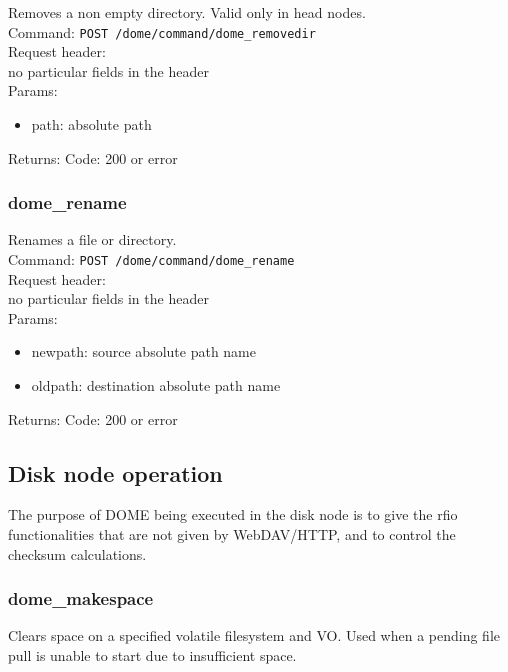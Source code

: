 \documentclass[a4paper,10pt]{scrreprt}
\begin{document}
Removes a non empty directory. Valid only in head nodes.\\
Command:
\lstinline"POST /dome/command/dome_removedir"\\

Request header:\\
no particular fields in the header\\

Params:
\begin{itemize}
 \item path: absolute path
\end{itemize}

Returns:
Code: 200 or error



\subsubsection{dome\_rename}

Renames a file or directory.\\
Command:
\lstinline"POST /dome/command/dome_rename"\\

Request header:\\
no particular fields in the header\\

Params:
\begin{itemize}
 \item newpath: source absolute path name
 \item oldpath: destination absolute path name
\end{itemize}

Returns:
Code: 200 or error




\subsection{Disk node operation}
The purpose of DOME being executed in the disk node is to give the rfio functionalities that are not
given by WebDAV/HTTP, and to control the checksum calculations.\\

\subsubsection{dome\_makespace}

Clears space on a specified volatile filesystem and VO. Used when a pending file pull is unable to start
due to insufficient space.
\end{document}
